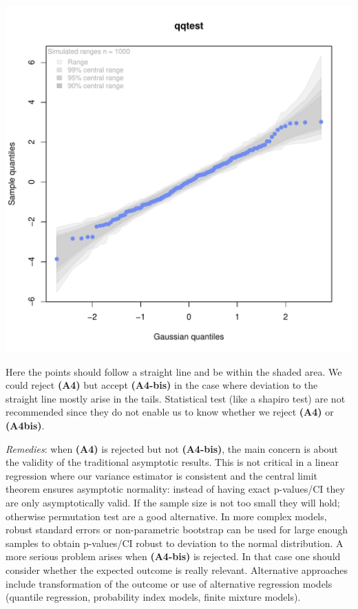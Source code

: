 \documentclass[12pt]{article}
\begin{document}
\begin{center}
\includegraphics[width=.9\linewidth]{./figures/A4-qqplot-res.pdf}
\end{center}

Here the points should follow a straight line and be within the shaded
area. We could reject \textbf{(A4)} but accept \textbf{(A4-bis)} in the case where
deviation to the straight line mostly arise in the tails.  Statistical
test (like a shapiro test) are not recommended since they do not
enable us to know whether we reject \textbf{(A4)} or \textbf{(A4bis)}. 

\bigskip

\emph{Remedies}: when \textbf{(A4)} is rejected but not \textbf{(A4-bis)}, the main
concern is about the validity of the traditional asymptotic
results. This is not critical in a linear regression where our
variance estimator is consistent and the central limit theorem ensures
asymptotic normality: instead of having exact p-values/CI they are
only asymptotically valid. If the sample size is not too small they
will hold; otherwise permutation test are a good alternative. In more
complex models, robust standard errors or non-parametric bootstrap can
be used for large enough samples to obtain p-values/CI robust to
deviation to the normal distribution. \newline A more serious problem
arises when \textbf{(A4-bis)} is rejected. In that case one should consider
whether the expected outcome is really relevant. Alternative
approaches include transformation of the outcome or use of alternative
regression models (quantile regression, probability index models,
finite mixture models).
\end{document}
